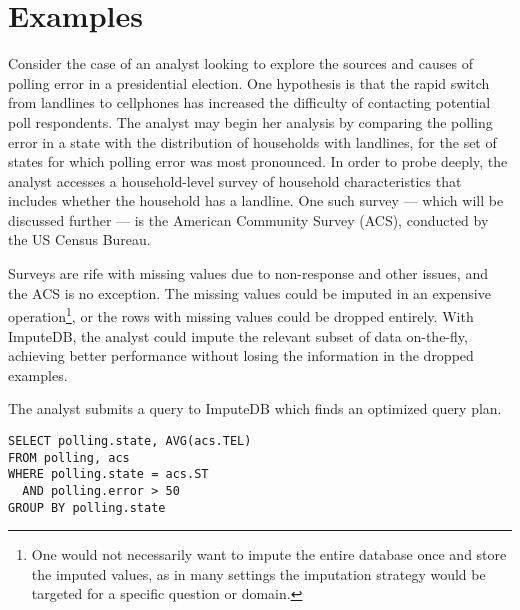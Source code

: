 \section{Examples}

Consider the case of an analyst looking to explore the sources and causes of
polling error in a presidential election. One hypothesis \cite{zukin2015s}
is that the rapid switch from landlines to cellphones has increased the
difficulty of contacting potential poll respondents. The analyst may
begin her analysis by comparing the polling error in a state with the
distribution of households with landlines, for the set of states for which
polling error was most pronounced. In order to probe deeply, the analyst
accesses a household-level survey of household characteristics that includes
whether the household has a landline. One such survey --- which will be
discussed further --- is the American Community Survey (ACS), conducted by the
US Census Bureau.

Surveys are rife with missing values due to non-response and other issues, and
the ACS is no exception. The missing values could be imputed in an expensive
operation\footnote{One would not necessarily want to impute the entire database once and
store the imputed values, as in many settings the imputation strategy would be
targeted for a specific question or domain.}, or the rows with missing values could be dropped entirely. With
ImputeDB, the analyst could impute the relevant subset of data on-the-fly,
achieving better performance without losing the information in the dropped
examples.

The analyst submits a query to ImputeDB which finds an optimized query plan.

\begin{verbatim}
SELECT polling.state, AVG(acs.TEL)
FROM polling, acs
WHERE polling.state = acs.ST
  AND polling.error > 50
GROUP BY polling.state
\end{verbatim}


